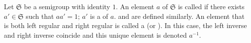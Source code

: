 Let $\mathfrak{S}$ be a semigroup with identity $1$. An element $a$ of $\mathfrak{S}$ is called  if there exists $a' \in \mathfrak{S}$ such that $aa' = 1$; $a'$ is a  of $a$.  and  are defined similarly. An element that is both left regular and right regular is called a  (or ). In this case, the left inverse and right inverse coincide and this unique element is denoted $a^{-1}$.
